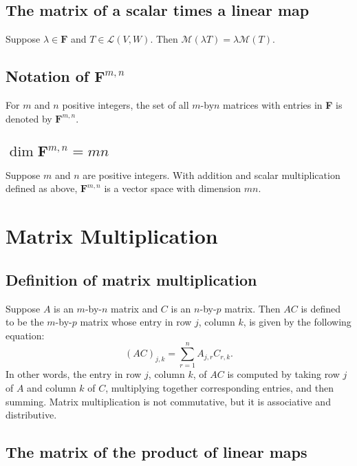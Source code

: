 \documentclass[11pt]{article}
\begin{document}
    \subsection{The matrix of a scalar times a linear map}

    Suppose \(\lambda \in \textbf{F}\) and \(T \in \mathcal{L}(V,W)\). Then \(\mathcal{M}(\lambda T) = \lambda \mathcal{M}(T)\). 

    \subsection{Notation of \(\textbf{F}^{m,n}\)}

    For $m$ and $n$ positive integers, the set of all $m$-by$n$ matrices with entries in \textbf{F} is denoted by \(\textbf{F}^{m,n}\).

    \subsection{\(\dim \textbf{F}^{m,n} = mn\)}

    Suppose $m$ and $n$ are positive integers. With addition and scalar multiplication defined as above, \(\textbf{F}^{m,n}\) is a vector space with dimension $mn$. 

    \section{Matrix Multiplication}

    \subsection{Definition of matrix multiplication}

    Suppose $A$ is an $m$-by-$n$ matrix and $C$ is an $n$-by-$p$ matrix. Then $AC$ is defined to be the $m$-by-$p$ matrix whose entry in row $j$, column $k$, is given by the following equation: \[(AC)_{j,k} = \sum_{r=1}^{n} A_{j,r} C_{r,k}.\] In other words, the entry in row $j$, column $k$, of $AC$ is computed by taking row $j$ of $A$ and column $k$ of $C$, multiplying together corresponding entries, and then summing. Matrix multiplication is not commutative, but it is associative and distributive. 

    \subsection{The matrix of the product of linear maps}
\end{document}
